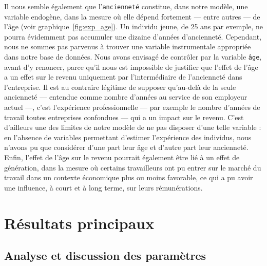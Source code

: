 \documentclass[a4paper, french, 11 pt]{article}\usepackage[]{graphicx}\usepackage[]{xcolor}
\begin{document}
Il nous semble également que l'\texttt{ancienneté} constitue, dans notre modèle, une variable endogène, dans la mesure où elle dépend fortement --- entre autres --- de l'âge (voir graphique~\ref{fig:exp_age}). Un individu jeune, de 25 ans par exemple, ne pourra évidemment pas accumuler une dizaine d’années d’ancienneté. Cependant, nous ne sommes pas parvenus à trouver une variable instrumentale appropriée dans notre base de données. Nous avons envisagé de contrôler par la variable \texttt{âge}, avant d'y renoncer, parce qu'il nous est impossible de justifier que l'effet de l'âge a un effet sur le revenu uniquement par l'intermédiaire de l'ancienneté dans l'entreprise. Il est au contraire légitime de supposer qu'au-delà de la seule ancienneté --- entendue comme nombre d'années au service de son employeur actuel ---, c'est l'expérience professionnelle ---  par exemple le nombre d'années de travail toutes entreprises confondues --- qui a un impact sur le revenu. C'est d'ailleurs une des limites de notre modèle de ne pas disposer d'une telle variable : en l'absence de variables permettant d'estimer l'expérience des individus, nous n'avons pu que considérer d'une part leur âge et d'autre part leur ancienneté. Enfin, l'effet de l'âge sur le revenu pourrait également être lié à un effet de génération, dans la mesure où certains travailleurs ont pu entrer sur le marché du travail dans un contexte économique plus ou moins favorable, ce qui a pu avoir une influence, à court et à long terme, sur leurs rémunérations. 







\section{Résultats principaux}

\subsection{Analyse et discussion des paramètres}
\end{document}
